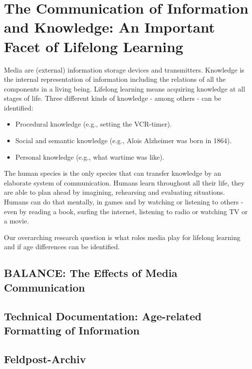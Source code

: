 \section{The Communication of Information and Knowledge: An
Important Facet of Lifelong Learning} 

Media are (external) information storage devices and transmitters. Knowledge is the internal representation of information including the relations of all the components in a living being. Lifelong learning means acquiring knowledge at all stages of life. Three different kinds of knowledge - among others - can be identified: 
\begin{itemize}
	\item Procedural knowledge (e.g., setting the VCR-timer).
	\item Social and semantic knowledge (e.g., Alois Alzheimer was born in 1864). 
	\item Personal knowledge (e.g., what wartime was like).
\end{itemize}

The human species is the only species that can transfer knowledge by an elaborate system of communication. Humans learn throughout all their life, they are able to plan ahead by imagining, rehearsing and evaluating situations. Humans can do that mentally, in games and by watching or listening to others - even by reading a book, surfing the internet, listening to radio or watching TV or a movie. 

 Our overarching research question is what roles media play for lifelong learning and if age differences can be identified.

\subsection{BALANCE: The Effects of Media Communication}



\newpage
\subsection{Technical Documentation: Age-related Formatting of Information}



\subsection{Feldpost-Archiv} 

